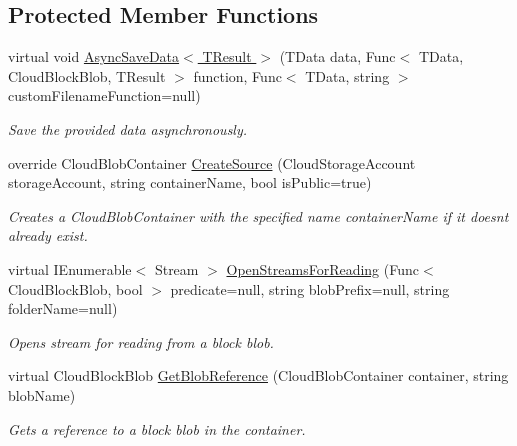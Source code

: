 \subsection*{Protected Member Functions}
\begin{DoxyCompactItemize}
\item 
virtual void \hyperlink{classCqrs_1_1Azure_1_1BlobStorage_1_1BlobStorageStore_a70157155d5b9ea9d1ac752014d6d0df6_a70157155d5b9ea9d1ac752014d6d0df6}{Async\+Save\+Data$<$ T\+Result $>$} (T\+Data data, Func$<$ T\+Data, Cloud\+Block\+Blob, T\+Result $>$ function, Func$<$ T\+Data, string $>$ custom\+Filename\+Function=null)
\begin{DoxyCompactList}\small\item\em Save the provided {\itshape data}  asynchronously. \end{DoxyCompactList}\item 
override Cloud\+Blob\+Container \hyperlink{classCqrs_1_1Azure_1_1BlobStorage_1_1BlobStorageStore_a68828f9e6c1f0d297623e5f0c9af0e7e_a68828f9e6c1f0d297623e5f0c9af0e7e}{Create\+Source} (Cloud\+Storage\+Account storage\+Account, string container\+Name, bool is\+Public=true)
\begin{DoxyCompactList}\small\item\em Creates a Cloud\+Blob\+Container with the specified name {\itshape container\+Name}  if it doesn\textquotesingle{}t already exist. \end{DoxyCompactList}\item 
virtual I\+Enumerable$<$ Stream $>$ \hyperlink{classCqrs_1_1Azure_1_1BlobStorage_1_1BlobStorageStore_a6a916e23890ba65048e449353bbd17c2_a6a916e23890ba65048e449353bbd17c2}{Open\+Streams\+For\+Reading} (Func$<$ Cloud\+Block\+Blob, bool $>$ predicate=null, string blob\+Prefix=null, string folder\+Name=null)
\begin{DoxyCompactList}\small\item\em Opens stream for reading from a block blob. \end{DoxyCompactList}\item 
virtual Cloud\+Block\+Blob \hyperlink{classCqrs_1_1Azure_1_1BlobStorage_1_1BlobStorageStore_a2d38c9a30365ae357f3cf5e300c6ca25_a2d38c9a30365ae357f3cf5e300c6ca25}{Get\+Blob\+Reference} (Cloud\+Blob\+Container container, string blob\+Name)
\begin{DoxyCompactList}\small\item\em Gets a reference to a block blob in the container. \end{DoxyCompactList}\end{DoxyCompactItemize}
